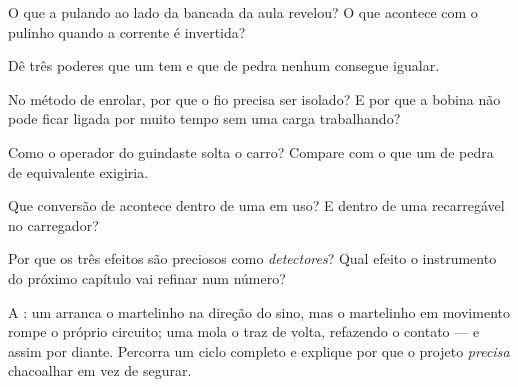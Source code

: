 \begin{exercise}[$\star$]\label{exo:g8:electric-current-effects:3}
O que a  pulando ao lado da bancada da aula revelou? O que
acontece com o pulinho quando a corrente é invertida?
\end{exercise}

\begin{exercise}[$\star$]\label{exo:g8:electric-current-effects:4}
Dê três poderes que um  tem e que  de pedra nenhum
consegue igualar.
\end{exercise}

\begin{exercise}[$\star$]\label{exo:g8:electric-current-effects:5}
No método de enrolar, por que o fio precisa ser isolado? E por que a
bobina não pode ficar ligada por muito tempo sem uma carga
trabalhando?
\end{exercise}

\begin{exercise}[$\star$]\label{exo:g8:electric-current-effects:6}
Como o operador do guindaste solta o carro? Compare com o que um 
de pedra de  equivalente exigiria.
\end{exercise}

\begin{exercise}[$\star$]\label{exo:g8:electric-current-effects:7}
Que conversão de  acontece dentro de uma  em uso? E
dentro de uma  recarregável no carregador?
\end{exercise}

\begin{exercise}[$\star$]\label{exo:g8:electric-current-effects:8}
Por que os três efeitos são preciosos como \emph{detectores}? Qual
efeito o instrumento do próximo capítulo vai refinar num número?
\end{exercise}

\begin{exercise}[$\star\star$]\label{exo:g8:electric-current-effects:9}
A : um  arranca o martelinho na direção do sino,
mas o martelinho em movimento rompe o próprio circuito; uma mola o
traz de volta, refazendo o contato --- e assim por diante. Percorra
um ciclo completo e explique por que o projeto \emph{precisa}
chacoalhar em vez de segurar.
\end{exercise}

